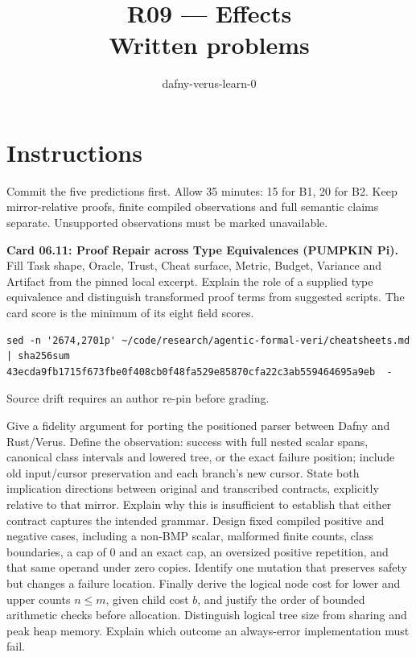 \documentclass[11pt]{article}
\title{R09 --- Effects \\ \large Written problems}
\author{dafny-verus-learn-0}
\date{}
\begin{document}
\maketitle
\section*{Instructions}
Commit the five predictions first. Allow 35 minutes: 15 for B1, 20 for B2.
Keep mirror-relative proofs, finite compiled observations and full semantic
claims separate. Unsupported observations must be marked unavailable.
\begin{problem}\label{prob:B1}
\textbf{Card 06.11: Proof Repair across Type Equivalences (PUMPKIN Pi).}
Fill Task shape, Oracle, Trust, Cheat surface, Metric, Budget, Variance and
Artifact from the pinned local excerpt. Explain the role of a supplied type
equivalence and distinguish transformed proof terms from suggested scripts.
The card score is the minimum of its eight field scores.
\begin{verbatim}
sed -n '2674,2701p' ~/code/research/agentic-formal-veri/cheatsheets.md | sha256sum
43ecda9fb1715f673fbe0f408cb0f48fa529e85870cfa22c3ab559464695a9eb  -
\end{verbatim}
Source drift requires an author re-pin before grading.
\end{problem}
\begin{problem}[proof]\label{prob:B2}
Give a fidelity argument for porting the positioned parser between Dafny and
Rust/Verus. Define the observation: success with full nested scalar spans,
canonical class intervals and lowered tree, or the exact failure position;
include old input/cursor preservation and each branch's new cursor.
State both implication directions between original and transcribed contracts,
explicitly relative to that mirror. Explain why this is insufficient to
establish that either contract captures the intended grammar.
Design fixed compiled positive and negative cases, including a non-BMP scalar,
malformed finite counts, class boundaries, a cap of 0 and an exact cap, an oversized positive
repetition, and that same operand under zero copies. Identify one mutation
that preserves safety but changes a failure location.
Finally derive the logical node cost for lower and upper counts $n\le m$,
given child cost $b$, and justify the order of bounded arithmetic checks before
allocation. Distinguish logical tree size from sharing and peak heap memory.
Explain which outcome an always-error implementation must fail.
\end{problem}
\end{document}
